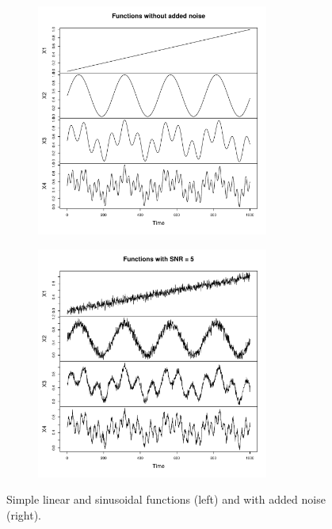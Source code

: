 \begin{figure}[h]
  \begin{subfigure}[b]{0.45\textwidth}
\includegraphics[width = 0.9\linewidth, height = 3in]{./figs/coeff-interp-simple-functions0.pdf}
  \end{subfigure}
  \hfill
  \begin{subfigure}[b]{0.45\textwidth}
  \includegraphics[width = 0.9\linewidth, height = 3in]{./figs/coeff-interp-simple-functions1.pdf}
  \end{subfigure}
  \caption{Simple linear and sinusoidal functions (left) and with
  added noise (right).}
     \label{fig:simple-functions}
\end{figure}

